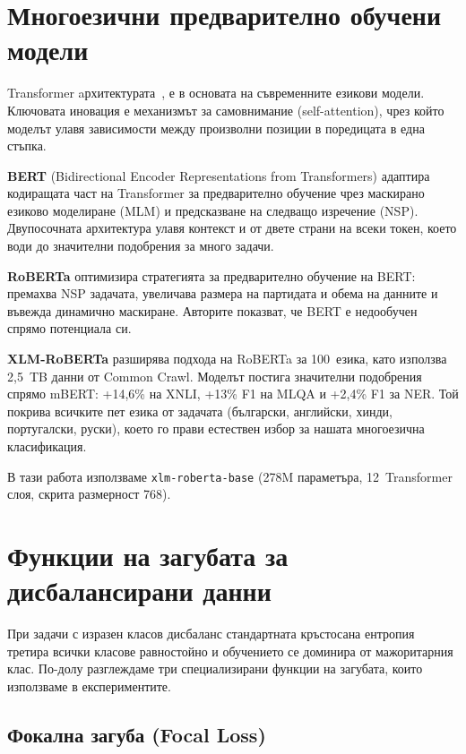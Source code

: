 \documentclass[12pt,a4paper]{report}
\begin{document}
\section{Многоезични предварително обучени модели}

Transformer aрхитектурата~\cite{vaswani2017attention}, е в основата на съвременните езикови модели. Ключовата иновация е механизмът за самовнимание (self-attention), чрез който моделът улавя зависимости между произволни позиции в поредицата в една стъпка.

\textbf{BERT} (Bidirectional Encoder Representations from Transformers) \cite{devlin2019bert} адаптира кодиращата част на Transformer за предварително обучение чрез маскирано езиково моделиране (MLM) и предсказване на следващо изречение (NSP). Двупосочната архитектура улавя контекст и от двете страни на всеки токен, което води до значителни подобрения за много задачи.

\textbf{RoBERTa} \cite{liu2019roberta} оптимизира стратегията за предварително обучение на BERT: премахва NSP задачата, увеличава размера на партидата и обема на данните и въвежда динамично маскиране. Авторите показват, че BERT е недообучен спрямо потенциала си.

\textbf{XLM-RoBERTa} \cite{conneau2020xlmr} разширява подхода на RoBERTa за 100~езика, като използва 2,5~TB данни от Common Crawl. Моделът постига значителни подобрения спрямо mBERT: +14,6\% на XNLI, +13\% F1 на MLQA и +2,4\% F1 за NER. Той покрива всичките пет езика от задачата (български, английски, хинди, португалски, руски), което го прави естествен избор за нашата многоезична класификация.

В тази работа използваме \texttt{xlm-roberta-base} (278M параметъра, 12~Transformer слоя, скрита размерност 768).


\section{Функции на загубата за дисбалансирани данни}
\label{sec:loss_functions}

При задачи с изразен класов дисбаланс стандартната кръстосана ентропия третира всички класове равностойно и обучението се доминира от мажоритарния клас. По-долу разглеждаме три специализирани функции на загубата, които използваме в експериментите.

\subsection{Фокална загуба (Focal Loss)}
\end{document}
